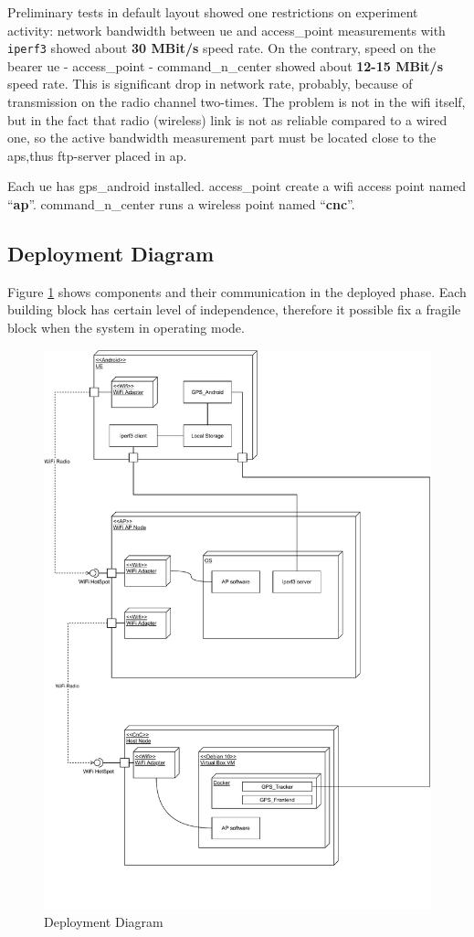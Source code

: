 Preliminary tests in default layout showed one restrictions on experiment activity: network bandwidth
between \gls{ue} and \acrshort{access_point} measurements with \texttt{iperf3} showed about \textbf{30 MBit/s} speed rate. On the contrary, speed on the bearer \gls{ue} - \acrshort{access_point} - \gls{command_n_center} showed about \textbf{12-15 MBit/s} speed rate. This is significant drop in network rate, probably, because of transmission on the radio channel two-times. The problem  is not in the \gls{wifi} itself, but in the fact that radio (wireless) link is not as reliable compared to a wired one, so the active bandwidth measurement part must be located close to the \glspl{ap},thus \acrshort{ftp}-server placed in \gls{ap}.

Each \gls{ue} has   \gls{gps_android} installed. \Gls{access_point} create a \gls{wifi} access point named ``\textbf{ap}''.
\Gls{command_n_center} runs a wireless point named
``\textbf{cnc}''.

\subsection{Deployment Diagram}\label{deployment-diagram}

Figure \ref{fig:deployment-diagram} shows components and their communication in the deployed phase. Each building block has certain level of independence, therefore it possible fix a fragile block when the system in operating mode.

\begin{figure}[H]
	\centering
	\includegraphics[width=0.8\linewidth, keepaspectratio]{images/Deployment Diagram-Deployment_Diagram.pdf}
	\caption{Deployment Diagram}
	\label{fig:deployment-diagram}
\end{figure}

